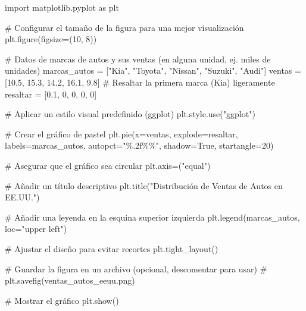 \documentclass[
  jou,
  floatsintext,
  longtable,
  a4paper,
  nolmodern,
  notxfonts,
  notimes,
  colorlinks=true,linkcolor=blue,citecolor=blue,urlcolor=blue]{apa7}
\newenvironment{Shaded}{\begin{snugshade}}{\end{snugshade}}
\newcommand{\CommentTok}[1]{\textcolor[rgb]{0.37,0.37,0.37}{#1}}
\newcommand{\DecValTok}[1]{\textcolor[rgb]{0.68,0.00,0.00}{#1}}
\newcommand{\FloatTok}[1]{\textcolor[rgb]{0.68,0.00,0.00}{#1}}
\newcommand{\ImportTok}[1]{\textcolor[rgb]{0.00,0.46,0.62}{#1}}
\newcommand{\NormalTok}[1]{\textcolor[rgb]{0.00,0.23,0.31}{#1}}
\newcommand{\OperatorTok}[1]{\textcolor[rgb]{0.37,0.37,0.37}{#1}}
\newcommand{\SpecialCharTok}[1]{\textcolor[rgb]{0.37,0.37,0.37}{#1}}
\newcommand{\StringTok}[1]{\textcolor[rgb]{0.13,0.47,0.30}{#1}}
\newcommand{\VariableTok}[1]{\textcolor[rgb]{0.07,0.07,0.07}{#1}}
\begin{document}
\begin{Shaded}
\begin{Highlighting}[]
\ImportTok{import}\NormalTok{ matplotlib.pyplot }\ImportTok{as}\NormalTok{ plt}

\CommentTok{\# Configurar el tamaño de la figura para una mejor visualización}
\NormalTok{plt.figure(figsize}\OperatorTok{=}\NormalTok{(}\DecValTok{10}\NormalTok{, }\DecValTok{8}\NormalTok{))}

\CommentTok{\# Datos de marcas de autos y sus ventas (en alguna unidad, ej. miles de unidades)}
\NormalTok{marcas\_autos }\OperatorTok{=}\NormalTok{ [}\StringTok{"Kia"}\NormalTok{, }\StringTok{"Toyota"}\NormalTok{, }\StringTok{"Nissan"}\NormalTok{, }\StringTok{"Suzuki"}\NormalTok{, }\StringTok{"Audi"}\NormalTok{]}
\NormalTok{ventas }\OperatorTok{=}\NormalTok{ [}\FloatTok{10.5}\NormalTok{, }\FloatTok{15.3}\NormalTok{, }\FloatTok{14.2}\NormalTok{, }\FloatTok{16.1}\NormalTok{, }\FloatTok{9.8}\NormalTok{]}
\CommentTok{\# Resaltar la primera marca (Kia) ligeramente}
\NormalTok{resaltar }\OperatorTok{=}\NormalTok{ [}\FloatTok{0.1}\NormalTok{, }\DecValTok{0}\NormalTok{, }\DecValTok{0}\NormalTok{, }\DecValTok{0}\NormalTok{, }\DecValTok{0}\NormalTok{]}

\CommentTok{\# Aplicar un estilo visual predefinido (ggplot)}
\NormalTok{plt.style.use(}\StringTok{"ggplot"}\NormalTok{)}

\CommentTok{\# Crear el gráfico de pastel}
\NormalTok{plt.pie(x}\OperatorTok{=}\NormalTok{ventas, explode}\OperatorTok{=}\NormalTok{resaltar, labels}\OperatorTok{=}\NormalTok{marcas\_autos, autopct}\OperatorTok{=}\StringTok{"}\SpecialCharTok{\%.2f\%\%}\StringTok{"}\NormalTok{, shadow}\OperatorTok{=}\VariableTok{True}\NormalTok{, startangle}\OperatorTok{=}\DecValTok{20}\NormalTok{)}

\CommentTok{\# Asegurar que el gráfico sea circular}
\NormalTok{plt.axis}\OperatorTok{=}\NormalTok{(}\StringTok{"equal"}\NormalTok{)}

\CommentTok{\# Añadir un título descriptivo}
\NormalTok{plt.title(}\StringTok{"Distribución de Ventas de Autos en EE.UU."}\NormalTok{)}

\CommentTok{\# Añadir una leyenda en la esquina superior izquierda}
\NormalTok{plt.legend(marcas\_autos, loc}\OperatorTok{=}\StringTok{"upper left"}\NormalTok{)}

\CommentTok{\# Ajustar el diseño para evitar recortes}
\NormalTok{plt.tight\_layout()}

\CommentTok{\# Guardar la figura en un archivo (opcional, descomentar para usar)}
\CommentTok{\# plt.savefig(\textquotesingle{}ventas\_autos\_eeuu.png\textquotesingle{})}

\CommentTok{\# Mostrar el gráfico}
\NormalTok{plt.show()}
\end{Highlighting}
\end{Shaded}
\end{document}
